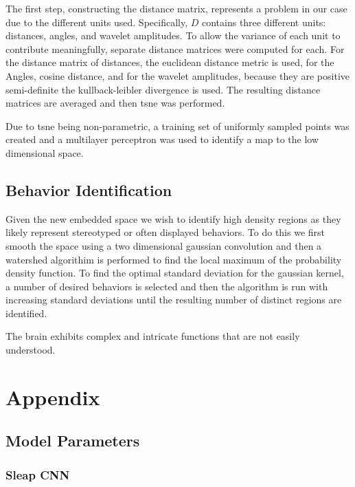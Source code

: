 \documentclass[12pt,english]{article}
\begin{document}
The first step, constructing the distance matrix, represents a problem in our case due to the different units used. Specifically, \( D \) contains three different units: distances, angles, and wavelet amplitudes. To allow the variance of each unit to contribute meaningfully, separate distance matrices were computed for each. For the distance matrix of distances, the euclidean distance metric is used, for the Angles, cosine distance, and for the wavelet amplitudes, because they are positive semi-definite the kullback-leibler divergence is used. The resulting distance matrices are averaged and then  tsne was performed. 

Due to tsne being non-parametric, a training set of uniformly sampled points was created and a multilayer perceptron was used to identify a map to the low dimensional space.  

\subsection{Behavior Identification}
Given the new embedded space we wish to identify high density regions as they likely represent stereotyped or often displayed behaviors. To do this we first smooth the space using a two dimensional gaussian convolution and then a watershed algorithim is performed to find the local maximum of the probability density function. To find the optimal standard deviation for the gaussian kernel, a number of desired behaviors is selected and then the algorithm is run with increasing standard deviations until the resulting number of distinct regions are identified.  


The brain exhibits complex and intricate functions that are not easily understood.








\section{Appendix}

\subsection{Model Parameters}
\subsubsection{Sleap CNN}
\end{document}
